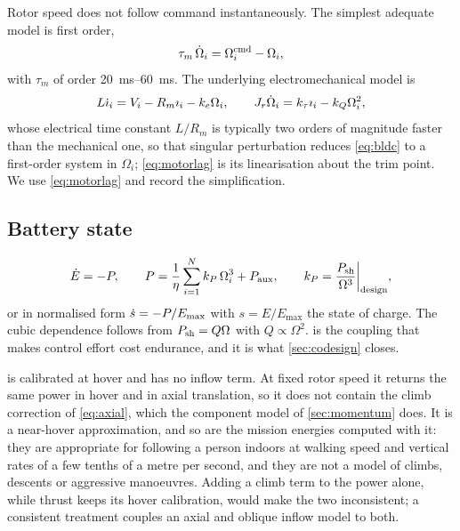 Rotor speed does not follow command instantaneously. The simplest adequate
model is first order,
\begin{equation}
  \tau_m\,\dot{\Omega}_i = \Omega_i^{\mathrm{cmd}} - \Omega_i ,
  \label{eq:motorlag}
\end{equation}
with $\tau_m$ of order \SIrange{20}{60}{\milli\second}. The underlying
electromechanical model is
\begin{equation}
  L\dot{\imath}_i = V_i - R_m \imath_i - k_e\Omega_i,
  \qquad
  J_r\dot{\Omega}_i = k_\tau \imath_i - k_Q\Omega_i^2 ,
  \label{eq:bldc}
\end{equation}
whose electrical time constant $L/R_m$ is typically two orders of magnitude
faster than the mechanical one, so that singular perturbation reduces
\cref{eq:bldc} to a first-order system in $\Omega_i$; \cref{eq:motorlag} is its
linearisation about the trim point. We use \cref{eq:motorlag} and record the
simplification.

\subsection{Battery state}

\begin{equation}
  \dot{E} = -P, \qquad
  P = \frac{1}{\eta}\sum_{i=1}^{N} k_P\,\Omega_i^{3} + P_{\mathrm{aux}} ,
  \qquad
  k_P = \frac{P_{\mathrm{sh}}}{\Omega^3}\bigg|_{\text{design}} ,
  \label{eq:edot}
\end{equation}
or in normalised form $\dot{s} = -P/E_{\max}$ with $s = E/E_{\max}$ the state of
charge. The cubic dependence follows from $P_{\mathrm{sh}} = Q\Omega$ with
$Q\propto\Omega^2$.  is the coupling that makes control effort
cost endurance, and it is what \cref{sec:codesign} closes.

 is calibrated at hover and has no inflow term. At fixed rotor
speed it returns the same power in hover and in axial translation, so it does
not contain the climb correction of \cref{eq:axial}, which the component model
of \cref{sec:momentum} does. It is a near-hover approximation, and so are the
mission energies computed with it: they are appropriate for following a person
indoors at walking speed and vertical rates of a few tenths of a metre per
second, and they are not a model of climbs, descents or aggressive manoeuvres.
Adding a climb term to the power alone, while thrust keeps its hover
calibration, would make the two inconsistent; a consistent treatment couples an
axial and oblique inflow model to both.

